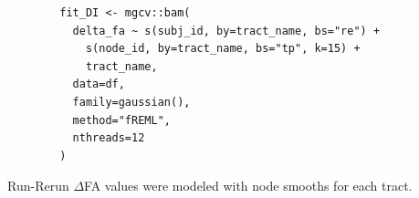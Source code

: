 \documentclass[12pt]{article}
\begin{document}
\begin{equ}[H]
	\begin{lstlisting}
		fit_DI <- mgcv::bam(
		  delta_fa ~ s(subj_id, by=tract_name, bs="re") +
		    s(node_id, by=tract_name, bs="tp", k=15) +
		    tract_name,
		  data=df,
		  family=gaussian(),
		  method="fREML",
		  nthreads=12
		)
	\end{lstlisting}
	\caption{Run-Rerun $\Delta$FA values were modeled with node smooths for each tract.}
	\label{supp-code:gam-di}
\end{equ}



\end{document}
